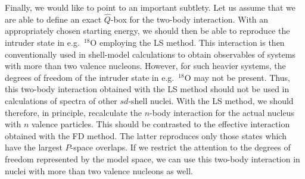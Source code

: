 Finally, we would like to point to an 
important subtlety. Let us assume that we are
able to define an exact $\hat{Q}$-box for the two-body interaction.
With an appropriately chosen starting energy, we should then be able to
reproduce the intruder state in e.g.\ $^{18}$O employing the LS method.
This interaction is then conventionally used in shell-model
calculations to obtain observables of systems with more than
two valence nucleons. However, for such heavier systems, the degrees
of freedom of the intruder state in e.g.\ $^{18}$O may not
be present. Thus, this two-body
interaction obtained with the LS method should not be used 
in calculations of spectra of other $sd$-shell nuclei. With the
LS  method, we should therefore, in principle, recalculate
the $n$-body interaction for the actual nucleus with $n$ valence 
particles.  
This should be contrasted to the effective interaction obtained
with the FD method. The latter reproduces only those states which have 
the largest $P$-space overlaps. If we restrict the attention to the
degrees of freedom represented by the model space, we can use
this two-body interaction in nuclei with more than two valence 
nucleons as well.

